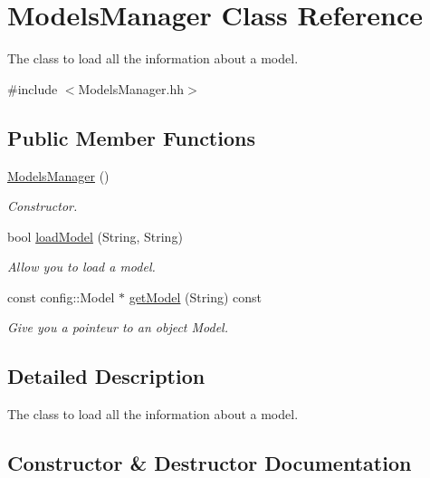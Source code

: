 \hypertarget{classModelsManager}{}\section{Models\+Manager Class Reference}
\label{classModelsManager}


The class to load all the information about a model.  




{\ttfamily \#include $<$Models\+Manager.\+hh$>$}

\subsection*{Public Member Functions}
\begin{DoxyCompactItemize}
\item 
\hyperlink{classModelsManager_a48f911933ce0a38aa78667e34e8098f4}{Models\+Manager} ()
\begin{DoxyCompactList}\small\item\em Constructor. \end{DoxyCompactList}\item 
bool \hyperlink{classModelsManager_a68352308cd93cb509b7266b0cf1bb5f3}{load\+Model} (String, String)
\begin{DoxyCompactList}\small\item\em Allow you to load a model. \end{DoxyCompactList}\item 
const config\+::\+Model $\ast$ \hyperlink{classModelsManager_aecbaab73572634a9e5cbc035b25864e1}{get\+Model} (String) const
\begin{DoxyCompactList}\small\item\em Give you a pointeur to an object Model. \end{DoxyCompactList}\end{DoxyCompactItemize}


\subsection{Detailed Description}
The class to load all the information about a model. 

\subsection{Constructor \& Destructor Documentation}
\mbox{\label{classModelsManager_a48f911933ce0a38aa78667e34e8098f4}} 
